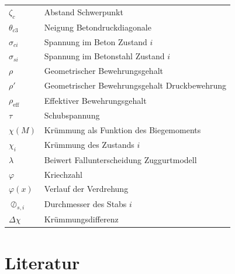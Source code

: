 \documentclass[
  12pt,
  letterpaper,
  egregdoesnotlikesansseriftitles]{scrreprt}
\begin{document}
\begin{longtable}[]{@{}
  >{\raggedright\arraybackslash}p{}
  >{\raggedright\arraybackslash}p{}@{}}
\(\zeta_c\) & Abstand Schwerpunkt \\
\(\theta_{c3}\) & Neigung Betondruckdiagonale \\
\(\sigma_{ci}\) & Spannung im Beton Zustand \(i\) \\
\(\sigma_{si}\) & Spannung im Betonstahl Zustand \(i\) \\
\(\rho\) & Geometrischer Bewehrungsgehalt \\
\(\rho'\) & Geometrischer Bewehrungsgehalt Druckbewehrung \\
\(\rho_{\text{eff}}\) & Effektiver Bewehrungsgehalt \\
\(\tau\) & Schubspannung \\
\(\chi(M)\) & Krümmung als Funktion des Biegemoments \\
\(\chi_i\) & Krümmung des Zustands \(i\) \\
\(\lambda\) & Beiwert Fallunterscheidung Zuggurtmodell \\
\(\varphi\) & Kriechzahl \\
\(\varphi(x)\) & Verlauf der Verdrehung \\
\(\oslash_{s,i}\) & Durchmesser des Stabs \(i\) \\
\(\Delta\chi\) & Krümmungsdifferenz \\
\end{longtable}


\chapter*{Literatur}\label{literatur}

\end{document}
